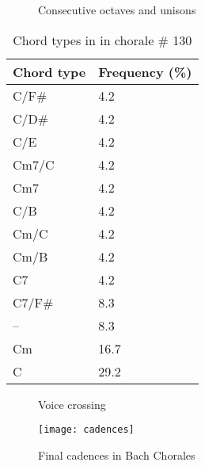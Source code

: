 \documentclass[a0paper]{sciposter}
\begin{document}
\begin{multicols}{2}
\begin{center}
\begin{figure}[!h]
  \centering
  \qquad
  \qquad
  \caption{Consecutive octaves and unisons}
  \label{fig:oitavas-e-unissonos}
\end{figure}

\begin{table}[t]
  \centering
\begin{tabular}{l|l} \hline
 Chord type & Frequency (\%) \\ \hline
 C/F\#                & 4.2 \\
 C/D\#                & 4.2\\
 C/E                 & 4.2\\
 Cm7/C               & 4.2\\
 Cm7                 & 4.2\\
 C/B                 & 4.2\\
 Cm/C                & 4.2\\
 Cm/B                & 4.2\\
 C7                  & 4.2\\
 C7/F\#               & 8.3\\
 --                  & 8.3\\
 Cm                  &16.7\\
 C                   &29.2 \\ \hline
\end{tabular}
\caption{Chord types in in chorale \# 130}
\label{tab:ctc130}
\end{table}

\begin{figure}[!h]
  \centering
  \caption{Voice crossing}
  \label{fig:coral-003}
\end{figure}

\begin{figure}
  \centering
  \texttt{[image: cadences]}
  \caption{Final cadences in Bach Chorales}
  \label{fig:cadences}
\end{figure}


\end{center}
\end{multicols}
\end{document}

